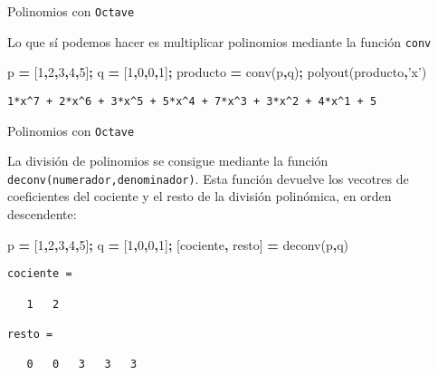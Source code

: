 \documentclass[
  ignorenonframetext,
]{beamer}
\newenvironment{Shaded}{\begin{snugshade}}{\end{snugshade}}
\newcommand{\FloatTok}[1]{\textcolor[rgb]{0.00,0.00,0.81}{#1}}
\newcommand{\FunctionTok}[1]{\textcolor[rgb]{0.00,0.00,0.00}{#1}}
\newcommand{\NormalTok}[1]{#1}
\newcommand{\OperatorTok}[1]{\textcolor[rgb]{0.81,0.36,0.00}{\textbf{#1}}}
\newcommand{\StringTok}[1]{\textcolor[rgb]{0.31,0.60,0.02}{#1}}
\begin{document}
\begin{frame}[fragile]{Polinomios con \texttt{Octave}}
\protect\hypertarget{polinomios-con-octave-5}{}

Lo que sí podemos hacer es multiplicar polinomios mediante la función
\texttt{conv}

\begin{Shaded}
\begin{Highlighting}[]
\NormalTok{p }\OperatorTok{=}\NormalTok{ [}\FloatTok{1}\OperatorTok{,}\FloatTok{2}\OperatorTok{,}\FloatTok{3}\OperatorTok{,}\FloatTok{4}\OperatorTok{,}\FloatTok{5}\NormalTok{]}\OperatorTok{;}
\NormalTok{q }\OperatorTok{=}\NormalTok{ [}\FloatTok{1}\OperatorTok{,}\FloatTok{0}\OperatorTok{,}\FloatTok{0}\OperatorTok{,}\FloatTok{1}\NormalTok{]}\OperatorTok{;}
\NormalTok{producto }\OperatorTok{=} \FunctionTok{conv}\NormalTok{(p}\OperatorTok{,}\NormalTok{q)}\OperatorTok{;}
\FunctionTok{polyout}\NormalTok{(producto}\OperatorTok{,}\StringTok{'x'}\NormalTok{)}
\end{Highlighting}
\end{Shaded}

\begin{verbatim}
1*x^7 + 2*x^6 + 3*x^5 + 5*x^4 + 7*x^3 + 3*x^2 + 4*x^1 + 5
\end{verbatim}

\end{frame}

\begin{frame}[fragile]{Polinomios con \texttt{Octave}}
\protect\hypertarget{polinomios-con-octave-6}{}

La división de polinomios se consigue mediante la función
\texttt{deconv(numerador,denominador)}. Esta función devuelve los
vecotres de coeficientes del cociente y el resto de la división
polinómica, en orden descendente:

\begin{Shaded}
\begin{Highlighting}[]
\NormalTok{p }\OperatorTok{=}\NormalTok{ [}\FloatTok{1}\OperatorTok{,}\FloatTok{2}\OperatorTok{,}\FloatTok{3}\OperatorTok{,}\FloatTok{4}\OperatorTok{,}\FloatTok{5}\NormalTok{]}\OperatorTok{;}
\NormalTok{q }\OperatorTok{=}\NormalTok{ [}\FloatTok{1}\OperatorTok{,}\FloatTok{0}\OperatorTok{,}\FloatTok{0}\OperatorTok{,}\FloatTok{1}\NormalTok{]}\OperatorTok{;}
\NormalTok{[cociente}\OperatorTok{,}\NormalTok{ resto] }\OperatorTok{=} \FunctionTok{deconv}\NormalTok{(p}\OperatorTok{,}\NormalTok{q)}
\end{Highlighting}
\end{Shaded}

\begin{verbatim}
cociente =

   1   2

resto =

   0   0   3   3   3
\end{verbatim}

\end{frame}
\end{document}

